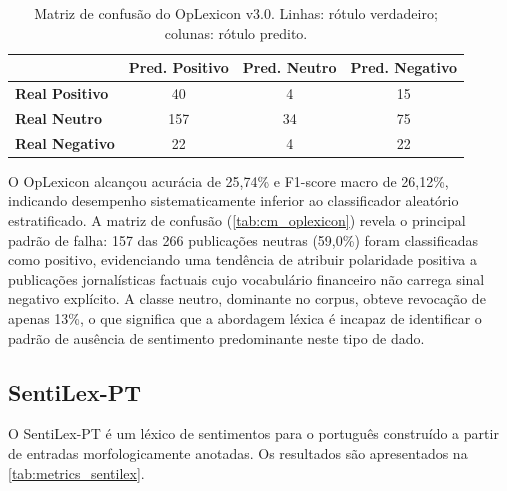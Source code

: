 \begin{table}[!htbp]
	\caption[Matriz de confusão — OpLexicon v3.0]{Matriz de confusão do OpLexicon v3.0. Linhas: rótulo verdadeiro; colunas: rótulo predito.}
	\label{tab:cm_oplexicon}
	\centering
	\begin{tabular}{lccc}
		\hline
		& \textbf{Pred. Positivo} & \textbf{Pred. Neutro} & \textbf{Pred. Negativo} \\
		\hline
		\textbf{Real Positivo} & 40                      & 4                     & 15                      \\
		\hline
		\textbf{Real Neutro}   & 157                     & 34                    & 75                      \\
		\hline
		\textbf{Real Negativo} & 22                      & 4                     & 22                      \\
		\hline
	\end{tabular}
\end{table}

O OpLexicon alcançou acurácia de 25,74\% e F1-score macro de 26,12\%, indicando desempenho sistematicamente inferior ao classificador aleatório estratificado. A matriz de confusão (\autoref{tab:cm_oplexicon}) revela o principal padrão de falha: 157 das 266 publicações neutras (59,0\%) foram classificadas como positivo, evidenciando uma tendência de atribuir polaridade positiva a publicações jornalísticas factuais cujo vocabulário financeiro não carrega sinal negativo explícito. A classe neutro, dominante no corpus, obteve revocação de apenas 13\%, o que significa que a abordagem léxica é incapaz de identificar o padrão de ausência de sentimento predominante neste tipo de dado.


\subsection{SentiLex-PT}
\label{subsec:res_sentilex}

O SentiLex-PT \cite{carvalho2015sentilex} é um léxico de sentimentos para o português construído a partir de entradas morfologicamente anotadas. Os resultados são apresentados na \autoref{tab:metrics_sentilex}.

